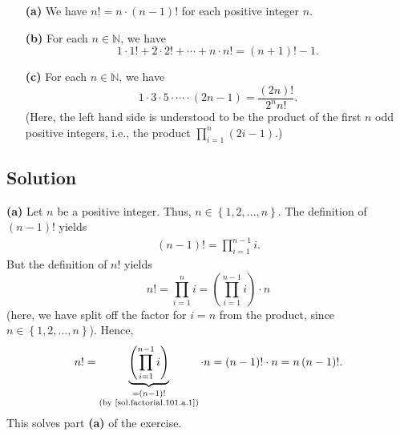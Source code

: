 \documentclass[paper=a4, fontsize=12pt]{scrartcl} %
\newcommand{\NN}{\mathbb{N}} %
\newcommand{\set}[1]{\left\{ #1 \right\}}
\newcommand{\tup}[1]{\left( #1 \right)}
\newcommand{\underbrack}[2]{\underbrace{#1}_{\substack{#2}}}
\let\prodnonlimits\prod
\renewcommand{\prod}{\prodnonlimits\limits}
\theoremstyle{plainsl}
\theoremstyle{definition}
\theoremstyle{remark}
\begin{document}
\begin{enumerate}

\item[\textbf{(a)}]
We have $n! = n \cdot \tup{n-1}!$ for each positive integer $n$.

\item[\textbf{(b)}]
For each $n \in \NN$, we have
\[
1 \cdot 1! + 2 \cdot 2! + \cdots + n \cdot n!
= \tup{n+1}! - 1 .
\]

\item[\textbf{(c)}]
For each $n \in \NN$, we have
\[
1 \cdot 3 \cdot 5 \cdot \cdots \cdot \tup{2n-1}
= \dfrac{\tup{2n}!}{2^n n!} .
\]
(Here, the left hand side is understood to be the
product of the first $n$ odd positive integers, i.e.,
the product $\prod_{i=1}^n \tup{2i-1}$.)

\end{enumerate}

\subsection{Solution}

\textbf{(a)}
Let $n$ be a positive integer.
Thus, $n \in \set{1, 2, \ldots, n}$.
The definition of $\tup{n-1}!$ yields
\begin{align}
\tup{n-1}! = \prod_{i=1}^{n-1} i .
\label{sol.factorial.101.a.1}
\end{align}
But the definition of $n!$ yields
\[
n!
= \prod_{i=1}^n i = \tup{\prod_{i=1}^{n-1} i} \cdot n
\]
(here, we have split off the factor for $i = n$ from the
product, since $n \in \set{1, 2, \ldots, n}$).
Hence,
\[
n! = \underbrack{\tup{\prod_{i=1}^{n-1} i}}{= \tup{n-1}! \\ \text{(by \eqref{sol.factorial.101.a.1})}}
      \cdot n
   = \tup{n-1}! \cdot n = n \tup{n-1}! .
\]
This solves part \textbf{(a)} of the exercise.
\end{document}
